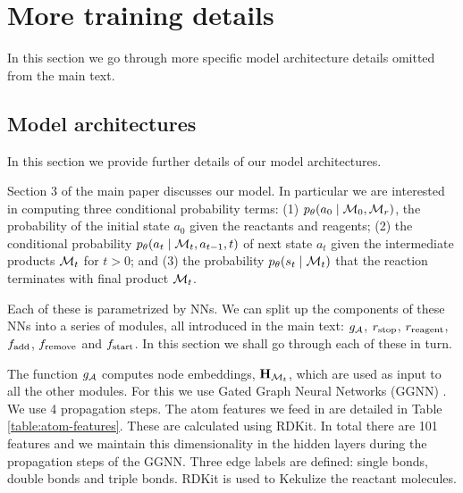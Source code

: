 \section{More training details}

In this section we go through more specific model architecture details omitted from the main text. 

\subsection{Model architectures}
In this section we provide further details of our model architectures.

Section 3 of the main paper discusses our model.
In particular we are interested in computing three conditional probability terms: (1) $p_\theta(a_0 \mid {\mathcal{M}}_0, {\mathcal{M}}_r)$, the probability of the initial state $a_0$ given the reactants and reagents; 
(2) the conditional probability $p_\theta(a_t \mid {\mathcal{M}}_t, a_{t-1}, t)$ 
of next state $a_t$ given the intermediate products ${\mathcal{M}}_t$ for $t > 0$;
and (3) the probability $p_\theta(s_t \mid {\mathcal{M}}_t)$ that the reaction terminates with final product ${\mathcal{M}}_{t}$.

Each of these is parametrized by NNs. We can split up the components of these NNs into a series of modules, all introduced in the main text: $g_{{\mathcal{A}}}$, $r_{\textrm{stop}}$, $r_\mathrm{reagent}$, $f_{\textrm{add}}$, $f_{\textrm{remove}}$ and $f_{\textrm{start}}$.
 In this section we shall go through each of these in turn.

The function $g_{{\mathcal{A}}}$ computes node embeddings, ${\mathbf{H}}_{{\mathcal{M}}_t}$, which are used as input to all the other modules. For this we use Gated Graph Neural Networks (GGNN) \citep{li2016gated, gilmer2017neural}.
 We use 4 propagation steps. 
 The atom features we feed in are detailed in Table \ref{table:atom-features}. These are calculated using RDKit. In total there are 101 features and we maintain this dimensionality in the hidden layers during the propagation steps of the GGNN. Three edge labels are defined: single bonds, double bonds and triple bonds. RDKit is used to Kekulize the reactant molecules. 


